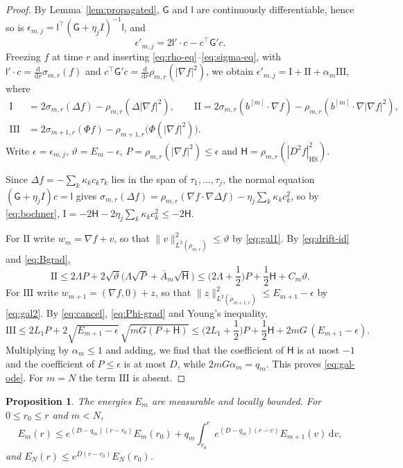 \documentclass[11pt]{amsart}
\numberwithin{equation}{section}
\theoremstyle{plain}
\newtheorem{proposition}[theorem]{Proposition}
\theoremstyle{remark}
\newcommand{\HS}{\mathrm{HS}}
\newcommand{\dd}{\mathrm{d}}
\begin{document}
\begin{proof}
By Lemma~\ref{lem:propagated}, $\mathsf G$ and $\mathsf l$ are continuously differentiable, hence so is $\epsilon_{m,j}=\mathsf l^{\top}(\mathsf G+\eta_jI)^{-1}\mathsf l$, and
\[
\epsilon'_{m,j}=2\mathsf l'\cdot c-c^{\top}\mathsf G'c.
\]
Freezing $f$ at time $r$ and inserting \eqref{eq:rho-eq}--\eqref{eq:sigma-eq}, with $\mathsf l'\cdot c=\frac{\dd}{\dd r}\sigma_{m,r}(f)$ and $c^{\top}\mathsf G'c=\frac{\dd}{\dd r}\rho_{m,r}(|\nabla f|^2)$, we obtain $\epsilon'_{m,j}=\mathrm{I}+\mathrm{II}+\alpha_m\mathrm{III}$, where
\begin{align*}
\mathrm I&=2\sigma_{m,r}(\Delta f)-\rho_{m,r}(\Delta|\nabla f|^2),\qquad \mathrm{II}=2\sigma_{m,r}(b^{[m]}\cdot\nabla f)-\rho_{m,r}(b^{[m]}\cdot\nabla|\nabla f|^2),\\
\mathrm{III}&=2\sigma_{m+1,r}(\Phi f)-\rho_{m+1,r}\big(\Phi(|\nabla f|^2)\big).
\end{align*}
Write $\epsilon=\epsilon_{m,j}$, $\vartheta=E_m-\epsilon$, $P=\rho_{m,r}(|\nabla f|^2)\le\epsilon$ and $\mathsf H=\rho_{m,r}(|D^2f|^2_\HS)$.

Since $\Delta f=-\sum_k\kappa_kc_k\tau_k$ lies in the span of $\tau_1,\dots,\tau_j$, the normal equation $(\mathsf G+\eta_jI)c=\mathsf l$ gives $\sigma_{m,r}(\Delta f)=\rho_{m,r}(\nabla f\cdot\nabla\Delta f)-\eta_j\sum_k\kappa_kc_k^2$, so by \eqref{eq:bochner}, $\mathrm I=-2\mathsf H-2\eta_j\sum_k\kappa_kc_k^2\le-2\mathsf H$.

For $\mathrm{II}$ write $w_m=\nabla f+v$, so that $\|v\|^2_{L^2(\rho_{m,r})}\le\vartheta$ by \eqref{eq:gal1}. By \eqref{eq:drift-id} and \eqref{eq:Bgrad},
\[
\mathrm{II}\le2\Lambda P+2\sqrt\vartheta\big(\Lambda\sqrt P+\bar A_m\sqrt{\mathsf H}\big)\le\Big(2\Lambda+\frac12\Big)P+\frac12\mathsf H+C_m\vartheta.
\]
For $\mathrm{III}$ write $w_{m+1}=(\nabla f,0)+z$, so that $\|z\|^2_{L^2(\rho_{m+1,r})}\le E_{m+1}-\epsilon$ by \eqref{eq:gal2}. By \eqref{eq:cancel}, \eqref{eq:Phi-grad} and Young's inequality,
\[
\mathrm{III}\le2L_1P+2\sqrt{E_{m+1}-\epsilon}\,\sqrt{mG(P+\mathsf H)}\le\Big(2L_1+\frac12\Big)P+\frac12\mathsf H+2mG\,(E_{m+1}-\epsilon).
\]
Multiplying by $\alpha_m\le1$ and adding, we find that the coefficient of $\mathsf H$ is at most $-1$ and the coefficient of $P\le\epsilon$ is at most $D$, while $2mG\alpha_m=q_m$. This proves \eqref{eq:gal-ode}. For $m=N$ the term $\mathrm{III}$ is absent.
\end{proof}

\begin{proposition}\label{prop:hierarchy}
The energies $E_m$ are measurable and locally bounded. For $0\le r_0\le r$ and $m<N$,
\begin{equation}\label{eq:hierarchy}
E_m(r)\le e^{(D-q_m)(r-r_0)}E_m(r_0)+q_m\int_{r_0}^re^{(D-q_m)(r-v)}E_{m+1}(v)\,\dd v,
\end{equation}
and $E_N(r)\le e^{D(r-r_0)}E_N(r_0)$.
\end{proposition}
\end{document}
